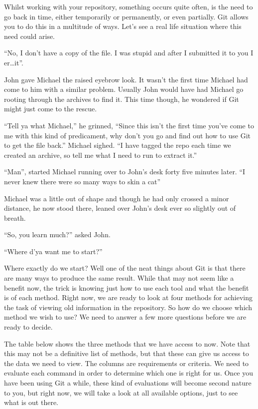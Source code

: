 Whilst working with your repository, something occurs quite often, is the need to go back in time, either temporarily or permanently, or even partially.
Git allows you to do this in a multitude of ways.
Let's see a real life situation where this need could arise.

\begin{trenches}
``No, I don't have a copy of the file.
I was stupid and after I submitted it to you I er\ldots\deleted it''.

John gave Michael the raised eyebrow look.
It wasn't the first time Michael had come to him with a similar problem.
Usually John would have had Michael go rooting through the archives to find it.
This time though, he wondered if Git might just come to the rescue.

``Tell ya what Michael,'' he grinned,
``Since this isn't the first time you've come to me with this kind of predicament, why don't you go and find out how to use Git to get the file back.'' Michael sighed.
``I have tagged the repo each time we created an archive, so tell me what I need to run to extract it.''

\thoughtbreak

``Man'', started Michael running over to John's desk forty five minutes later.
``I never knew there were so many ways to skin a cat''

Michael was a little out of shape and though he had only crossed a minor distance, he now stood there, leaned over John's desk ever so slightly out of breath.

``So, you learn much?'' asked John.

``Where d'ya want me to start?''

\end{trenches}

Where exactly do we start? Well one of the neat things about Git is that there are many ways to produce the same result.
While that may not seem like a benefit now, the trick is knowing just how to use each tool and what the benefit is of each method.
Right now, we are ready to look at four methods for achieving the task of viewing old information in the repository.
So how do we choose which method we wish to use? We need to answer a few more questions before we are ready to decide.

The table below shows the three methods that we have access to now.
Note that this may not be a definitive list of methods, but that these can give us access to the data we need to view.
The columns are requirements or criteria.
We need to evaluate each command in order to determine which one is right for us.
Once you have been using Git a while, these kind of evaluations will become second nature to you, but right now, we will take a look at all available options, just to see what is out there.

